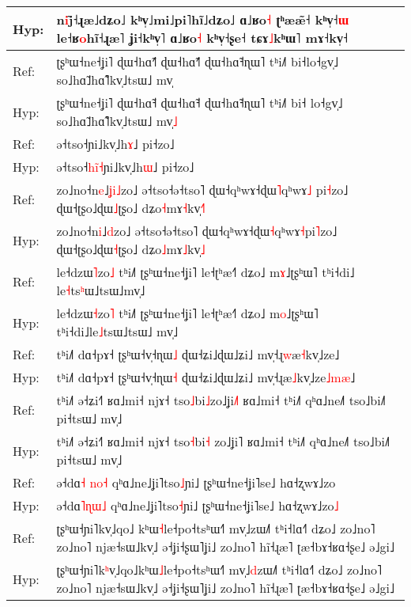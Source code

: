 \documentclass[10pt]{article}
\DeclareRobustCommand{\hl}[1]{{\textcolor{red}{#1}}}
\begin{document}
\begin{longtable}{ll}
Hyp: & n\hl{i}j\hl{̃}˧ɻæ˩dʑo˩ kʰv̩˩mi˩pi˥hĩ˩dʑo˩ ɑ˩ʁo\hl{˧} ʈʰææ̃˧ kʰv̩˧\hl{ɯ} le˧ʁ\hl{o}hĩ˧ɻæ˥ ʝi˧kʰv̩˥ ɑ˩ʁo\hl{˧} kʰv̩˧ʂe˧\hl{ }tɕɤ\hl{˩}kʰɯ˥ mɤ˧kv̩˧ \\ 
\midrule 
Ref: & ʈʂʰɯ˧ne˧ʝi˥ ɖɯ˧hɑ̃˧\hl{˥} ɖɯ˧hɑ̃˧\hl{˥} ɖɯ˧hɑ̃˧ɳɯ˥ tʰi˩˥ bi˧lo˧gv̩˩ so˩hɑ̃˩hɑ̃˥kv̩˩tsɯ˩ mv̩ \\ 
Hyp: & ʈʂʰɯ˧ne˧ʝi˥ ɖɯ˧hɑ̃˧ ɖɯ˧hɑ̃˧ ɖɯ˧hɑ̃˧ɳɯ˥ tʰi˩˥ bi˧\hl{ }lo˧gv̩˩ so˩hɑ̃˩hɑ̃˥kv̩˩tsɯ˩ mv̩\hl{˩} \\ 
\midrule 
Ref: & ə˧tso˧ɲi˩kv̩˩h\hl{ɤ}˩ pi˧zo˩ \\ 
Hyp: & ə˧tso˧\hl{h}\hl{i}\hl{̃}\hl{˧}ɲi˩kv̩˩h\hl{ɯ}˩ pi˧zo˩ \\ 
\midrule 
Ref: & zo˩no˧n\hl{e}˩\hl{ʝ}\hl{i}\hl{˩}zo˩ ə˧tso˧ə˧tso˥ ɖɯ˧qʰwɤ˧ɖɯ\hl{˥}qʰwɤ\hl{˩}\hl{ }pi\hl{˧}zo˩ ɖɯ˧ʈʂo˩ɖɯ\hl{˩}ʈʂo˩ dʑo\hl{˧}mɤ\hl{˧}kv̩\hl{˧}\hl{˥} \\ 
Hyp: & zo˩no˧n\hl{i}˩\hl{d}zo˩ ə˧tso˧ə˧tso˥ ɖɯ˧qʰwɤ˧ɖɯ\hl{˧}qʰwɤ\hl{˧}pi\hl{˥}zo˩ ɖɯ˧ʈʂo˩ɖɯ\hl{˧}ʈʂo˩ dʑo\hl{˩}mɤ\hl{˩}kv̩\hl{˩} \\ 
\midrule 
Ref: & le˧dzɯ\hl{˥}zo\hl{˩} tʰi˩˥ ʈʂʰɯ˧ne˧ʝi˥ le˧ʈʰæ˧˥ dʑo˩ m\hl{ɤ}˩ʈʂʰɯ˥ tʰi˧di˩\hl{ }le\hl{˧}ts\hl{ʰ}ɯ˩tsɯ˩mv̩˩ \\ 
Hyp: & le˧dzɯ\hl{˧}zo\hl{˥} tʰi˩˥ ʈʂʰɯ˧ne˧ʝi˥ le˧ʈʰæ˧˥ dʑo˩ m\hl{o}˩ʈʂʰɯ˥ tʰi˧di˩le\hl{˩}tsɯ˩tsɯ˩\hl{ }mv̩˩ \\ 
\midrule 
Ref: & tʰi˩˥ dɑ˧pɤ˧ ʈʂʰɯ˧v̩˧ɳɯ\hl{˩} ɖɯ˧ʑi˩ɖɯ˩ʑi˩ mv̩˧ɻ\hl{w}æ\hl{˧}kv̩˩ze˩ \\ 
Hyp: & tʰi˩˥ dɑ˧pɤ˧ ʈʂʰɯ˧v̩˧ɳɯ\hl{˧} ɖɯ˧ʑi˩ɖɯ˩ʑi˩ mv̩˧ɻæ\hl{˩}kv̩˩ze\hl{˩}\hl{m}\hl{æ}˩ \\ 
\midrule 
Ref: & tʰi˩˥ ə˧ʑi˧˥ ʁɑ˩mi˧ njɤ˧ tso\hl{˩}bi\hl{˩}zo˩ʝi\hl{˩}˥ ʁɑ˩mi˧ tʰi˩˥ qʰɑ˩ne˩˥ tso˩bi˩˥ pi˧tsɯ˩ mv̩˩ \\ 
Hyp: & tʰi˩˥ ə˧ʑi˧˥ ʁɑ˩mi˧ njɤ˧ tso\hl{˧}bi\hl{˧}\hl{ }zo˩ʝi˥ ʁɑ˩mi˧ tʰi˩˥ qʰɑ˩ne˩˥ tso˩bi˩˥ pi˧tsɯ˩ mv̩˩ \\ 
\midrule 
Ref: & ə˧dɑ\hl{˧}\hl{ }\hl{n}\hl{o}\hl{˧} qʰɑ˩ne˩ʝi˥tso\hl{˩}ɲi˩ ʈʂʰɯ˧ne˧ʝi˥se˩ hɑ˧ʐwɤ˩zo \\ 
Hyp: & ə˧dɑ\hl{˥}\hl{ɳ}\hl{ɯ}\hl{˩} qʰɑ˩ne˩ʝi˥tso\hl{˧}ɲi˩ ʈʂʰɯ˧ne˧ʝi˥se˩ hɑ˧ʐwɤ˩zo\hl{˩} \\ 
\midrule 
Ref: & ʈʂʰɯ˧ɲi˥kv̩˩qo˩\hl{ }kʰɯ\hl{˧}le˧po˧tsʰɯ˧˥ mv̩˩zɯ˩˥ tʰi˧lɑ˧˥ dʑo˩ zo˩no˥ zo˩no˥ njæ˧sɯ˩kv̩˩ ə˧ʝi˧ʂɯ˥ʝi˩ zo˩no˥ hĩ˧ɻæ˥ ʈæ˧bɤ˧ʁɑ˧ʂe˩ ə˩gi˩ \\ 
Hyp: & ʈʂʰɯ˧ɲi˥k\hl{ʰ}v̩˩qo˩kʰɯ\hl{˩}le˧po˧tsʰɯ˧˥ mv̩˩\hl{d}zɯ˩˥ tʰi˧lɑ˧˥ dʑo˩ zo˩no˥ zo˩no˥ njæ˧sɯ˩kv̩˩ ə˧ʝi˧ʂɯ˥ʝi˩ zo˩no˥ hĩ˧ɻæ˥ ʈæ˧bɤ˧ʁɑ˧ʂe˩ ə˩gi˩ \\ 

\end{longtable}
\end{document}
